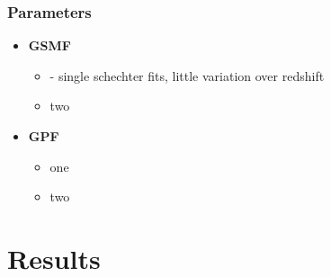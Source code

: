 \documentclass[useAMS, usenatbib]{mnras}
\begin{document}
        \subsubsection{Parameters}

            \begin{itemize}
                \item \textbf{GSMF}
                \begin{itemize}
                    \item \citep{Tomczak+2014} - single schechter fits, little variation over redshift\\
                    \item two
                \end{itemize}


                \item \textbf{GPF}
                \begin{itemize}
                    \item one \\
                    \item two
                \end{itemize}


            \end{itemize}






\section{Results}
    \label{sec:res}

\end{document}
